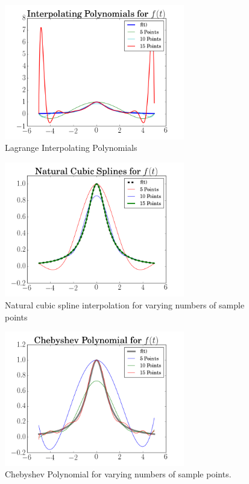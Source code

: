 \documentclass[12pt]{article}
\begin{document}
  \begin{figure}[h!]
    \centering
    \includegraphics[width=0.7\textwidth]{Problem5i.png}
    \caption{Lagrange Interpolating Polynomials}
  \end{figure}

  \begin{figure}[h!]
    \centering
    \includegraphics[width=0.7\textwidth]{Problem5ii.png}
    \caption{Natural cubic spline interpolation for varying numbers of sample points}
  \end{figure}

  \begin{figure}[h!]
    \centering
    \includegraphics[width=0.7\textwidth]{Problem5iii.png}
    \caption{Chebyshev Polynomial for varying numbers of sample points.}
  \end{figure}
\end{document}
